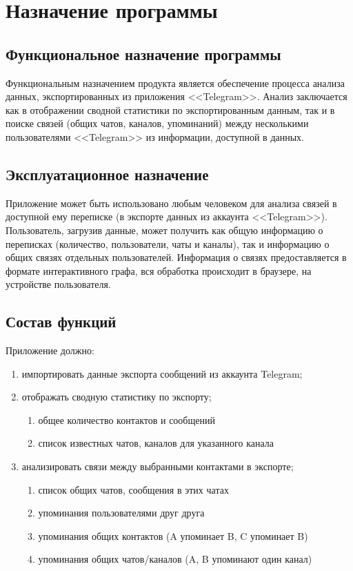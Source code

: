 \section{Назначение программы}

\subsection{Функциональное назначение программы}

Функциональным назначением продукта является обеспечение процесса анализа данных, экспортированных из приложения <<Telegram>>.
Анализ заключается как в отображении сводной статистики по экспортированным данным, так и в поиске связей (общих чатов, каналов, упоминаний) между несколькими пользователями <<Telegram>> из информации, доступной в данных.

\subsection{Эксплуатационное назначение}

Приложение может быть использовано любым человеком для анализа связей в доступной ему переписке (в экспорте данных из аккаунта <<Telegram>>).
Пользователь, загрузив данные, может получить как общую информацию о переписках (количество, пользователи, чаты и каналы), так и информацию о общих связях отдельных пользователей.
Информация о связях предоставляется в формате интерактивного графа, вся обработка происходит в браузере, на устройстве пользователя.

\subsection{Состав функций}

Приложение должно: 

\begin{enumerate}
    \item импортировать данные экспорта сообщений из аккаунта Telegram;
    \item отображать сводную статистику по экспорту;
    \begin{enumerate}
        \item общее количество контактов и сообщений
        \item список известных чатов, каналов для указанного канала
    \end{enumerate}
    \item анализировать связи между выбранными контактами в экспорте;
    \begin{enumerate}
        \item список общих чатов, сообщения в этих чатах
        \item упоминания пользователями друг друга
        \item упоминания общих контактов (A упоминает B, C упоминает B)
        \item упоминания общих чатов/каналов (A, B упоминают один канал)
    \end{enumerate}
\end{enumerate}
